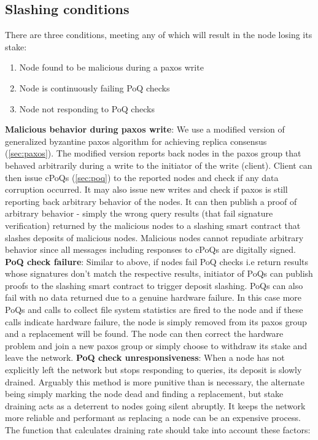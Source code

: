  \subsection{Slashing conditions} \label{sec:slashing}
 There are three conditions, meeting any of which will result in the node losing its stake:
 \begin{enumerate}
 	\item Node found to be malicious during a paxos write
 	\item Node is continuously failing \textsf{PoQ} checks
 	\item Node not responding to \textsf{PoQ} checks
 \end{enumerate}
\textbf{Malicious behavior during paxos write}: We use a modified version of generalized byzantine paxos algorithm \cite{byzantine_paxos} for achieving replica consensus (\cref{sec:paxos}). The modified version reports back nodes in the paxos group that behaved arbitrarily during a write to the initiator of the write (client). Client can then issue \textsf{cPoQ}s (\cref{sec:poq}) to the reported nodes and check if any data corruption occurred. It may also issue new writes and check if paxos is still reporting back arbitrary behavior of the nodes. It can then publish a proof of arbitrary behavior - simply the wrong query results (that fail signature verification) returned by the malicious nodes to a slashing smart contract that slashes deposits of malicious nodes. Malicious nodes cannot repudiate arbitrary behavior since all messages including responses to \textsf{cPoQ}s are digitally signed.
\newline\newline
\textbf{PoQ check failure}: Similar to above, if nodes fail \textsf{PoQ} checks i.e return results whose signatures don't match the respective results, initiator of \textsf{PoQ}s can publish proofs to the slashing smart contract to trigger deposit slashing. \textsf{PoQ}s can also fail with no data returned due to a genuine hardware failure. In this case more \textsf{PoQ}s and calls to collect file system statistics are fired to the node and if these calls indicate hardware failure, the node is simply removed from its paxos group and a replacement will be found. The node can then correct the hardware problem and join a new paxos group or simply choose to withdraw its stake and leave the network.
\newline\newline
\textbf{PoQ check unresponsiveness}: When a node has not explicitly left the network but stops responding to queries, its deposit is slowly drained. Arguably this method is more punitive than is necessary, the alternate being simply marking the node dead and finding a replacement, but stake draining acts as a deterrent to nodes going silent abruptly. It keeps the network more reliable and performant as replacing a node can be an expensive process. The function that calculates draining rate should take into account these factors:
